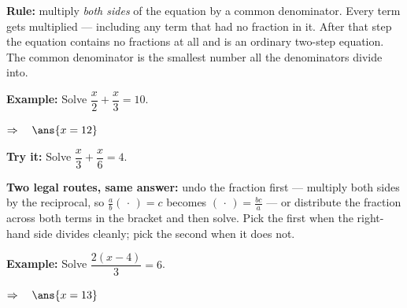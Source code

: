 \documentclass[12pt]{article}
\begin{document}


\begin{formulabox}
\textbf{Rule:} multiply \emph{both sides} of the equation by a common denominator. Every term gets
multiplied --- including any term that had no fraction in it. After that step the equation contains
no fractions at all and is an ordinary two-step equation.
The common denominator is the smallest number all the denominators divide into.
\end{formulabox}

\begin{examplebox}
\textbf{Example:} \quad Solve $\dfrac{x}{2} + \dfrac{x}{3} = 10$.

$\Rightarrow\quad \ans{x = 12}$
\end{examplebox}

\begin{tryitbox}
\textbf{Try it:} \quad Solve $\dfrac{x}{3} + \dfrac{x}{6} = 4$.\\[2pt]
\end{tryitbox}


\begin{formulabox}
\textbf{Two legal routes, same answer:}
undo the fraction first --- multiply both sides by the reciprocal, so
$\frac{a}{b}(\,\cdot\,) = c$ becomes $(\,\cdot\,) = \frac{bc}{a}$ --- or distribute the fraction
across both terms in the bracket and then solve. Pick the first when the right-hand side divides
cleanly; pick the second when it does not.
\end{formulabox}

\begin{examplebox}
\textbf{Example:} \quad Solve $\dfrac{2(x - 4)}{3} = 6$.

$\Rightarrow\quad \ans{x = 13}$
\end{examplebox}
\end{document}
